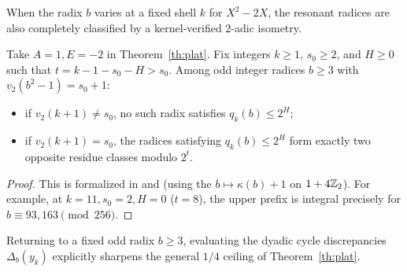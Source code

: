 \documentclass[11pt]{article}
\begin{document}
When the radix $b$ varies at a fixed shell $k$ for $X^2-2X$, the resonant radices are also completely classified by a kernel-verified $2$-adic isometry.

\begin{proposition}\label{th:resrad}
Take $A=1,E=-2$ in Theorem~\ref{th:plat}. Fix integers $k\ge1$, $s_0\ge2$, and $H\ge0$ such that $t=k-1-s_0-H>s_0$. Among odd integer radices $b\ge3$ with $v_2(b^2-1)=s_0+1$:
\begin{itemize}[leftmargin=2em,itemsep=2pt]
\item if $v_2(k+1)\ne s_0$, no such radix satisfies $q_k(b)\le2^H$;
\item if $v_2(k+1)=s_0$, the radices satisfying $q_k(b)\le2^H$ form exactly two opposite residue classes modulo $2^t$.
\end{itemize}
\end{proposition}
\begin{proof}
This is formalized in  and  (using the  $b\mapsto\kappa(b)+1$ on $1+4\mathbb Z_2$). For example, at $k=11,s_0=2,H=0$ ($t=8$), the upper prefix is integral precisely for $b\equiv93,163\pmod{256}$.
\end{proof}

Returning to a fixed odd radix $b\ge3$, evaluating the dyadic cycle discrepancies $\Delta_b(y_k)$ explicitly sharpens the general $1/4$ ceiling of Theorem~\ref{th:plat}.
\end{document}
